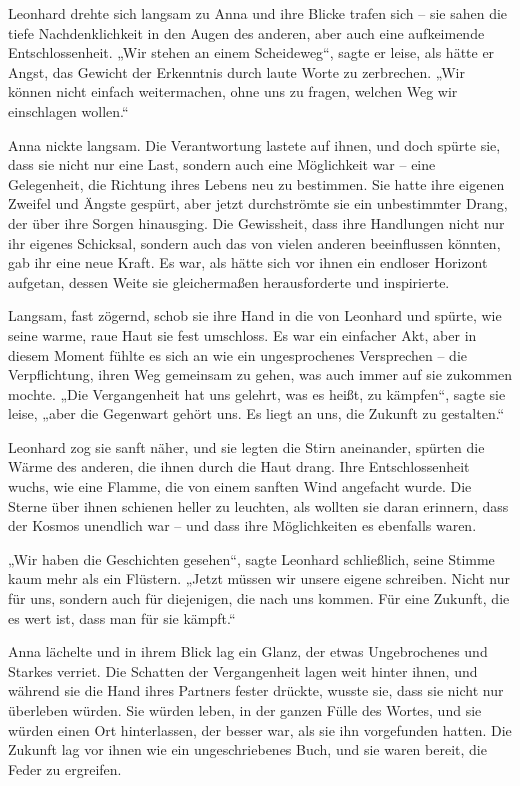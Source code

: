 \documentclass[
]{article}
\begin{document}
Leonhard drehte sich langsam zu Anna und ihre Blicke trafen sich -- sie
sahen die tiefe Nachdenklichkeit in den Augen des anderen, aber auch
eine aufkeimende Entschlossenheit. „Wir stehen an einem Scheideweg``,
sagte er leise, als hätte er Angst, das Gewicht der Erkenntnis durch
laute Worte zu zerbrechen. „Wir können nicht einfach weitermachen, ohne
uns zu fragen, welchen Weg wir einschlagen wollen.``

Anna nickte langsam. Die Verantwortung lastete auf ihnen, und doch
spürte sie, dass sie nicht nur eine Last, sondern auch eine Möglichkeit
war -- eine Gelegenheit, die Richtung ihres Lebens neu zu bestimmen. Sie
hatte ihre eigenen Zweifel und Ängste gespürt, aber jetzt durchströmte
sie ein unbestimmter Drang, der über ihre Sorgen hinausging. Die
Gewissheit, dass ihre Handlungen nicht nur ihr eigenes Schicksal,
sondern auch das von vielen anderen beeinflussen könnten, gab ihr eine
neue Kraft. Es war, als hätte sich vor ihnen ein endloser Horizont
aufgetan, dessen Weite sie gleichermaßen herausforderte und inspirierte.

Langsam, fast zögernd, schob sie ihre Hand in die von Leonhard und
spürte, wie seine warme, raue Haut sie fest umschloss. Es war ein
einfacher Akt, aber in diesem Moment fühlte es sich an wie ein
ungesprochenes Versprechen -- die Verpflichtung, ihren Weg gemeinsam zu
gehen, was auch immer auf sie zukommen mochte. „Die Vergangenheit hat
uns gelehrt, was es heißt, zu kämpfen``, sagte sie leise, „aber die
Gegenwart gehört uns. Es liegt an uns, die Zukunft zu gestalten.``

Leonhard zog sie sanft näher, und sie legten die Stirn aneinander,
spürten die Wärme des anderen, die ihnen durch die Haut drang. Ihre
Entschlossenheit wuchs, wie eine Flamme, die von einem sanften Wind
angefacht wurde. Die Sterne über ihnen schienen heller zu leuchten, als
wollten sie daran erinnern, dass der Kosmos unendlich war -- und dass
ihre Möglichkeiten es ebenfalls waren.

„Wir haben die Geschichten gesehen``, sagte Leonhard schließlich, seine
Stimme kaum mehr als ein Flüstern. „Jetzt müssen wir unsere eigene
schreiben. Nicht nur für uns, sondern auch für diejenigen, die nach uns
kommen. Für eine Zukunft, die es wert ist, dass man für sie kämpft.``

Anna lächelte und in ihrem Blick lag ein Glanz, der etwas Ungebrochenes
und Starkes verriet. Die Schatten der Vergangenheit lagen weit hinter
ihnen, und während sie die Hand ihres Partners fester drückte, wusste
sie, dass sie nicht nur überleben würden. Sie würden leben, in der
ganzen Fülle des Wortes, und sie würden einen Ort hinterlassen, der
besser war, als sie ihn vorgefunden hatten. Die Zukunft lag vor ihnen
wie ein ungeschriebenes Buch, und sie waren bereit, die Feder zu
ergreifen.
\end{document}
